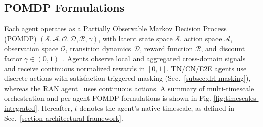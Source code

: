 \documentclass[12pt,lettersize,journal,onecolumn]{IEEEtran}
\begin{document}
\subsection{POMDP Formulations} \label{subsec:pomdp-models}
Each agent operates as a Partially Observable Markov Decision Process (POMDP) $(\mathcal{S},\mathcal{A},\mathcal{O},\mathcal{D},\mathcal{R},\gamma)$, with latent state space $\mathcal{S}$, action space $\mathcal{A}$, observation space $\mathcal{O}$, transition dynamics $\mathcal{D}$, reward function $\mathcal{R}$, and discount factor $\gamma \in (0,1)$~\cite{marl24albrecht}. Agents observe local and aggregated cross-domain signals and receive continuous normalized rewards in $[0,1]$. TN/CN/E2E agents use discrete actions with satisfaction-triggered masking (Sec.~\ref{subsec:drl-masking}), whereas the RAN agent~\cite{camad24ebrahimi} uses continuous actions. A summary of multi-timescale orchestration and per-agent POMDP formulations is shown in Fig. \ref{fig:timescales-integrated}. Hereafter, $t$ denotes the agent's native timescale, as defined in Sec.~\ref{section-architectural-framework}. %
\end{document}
